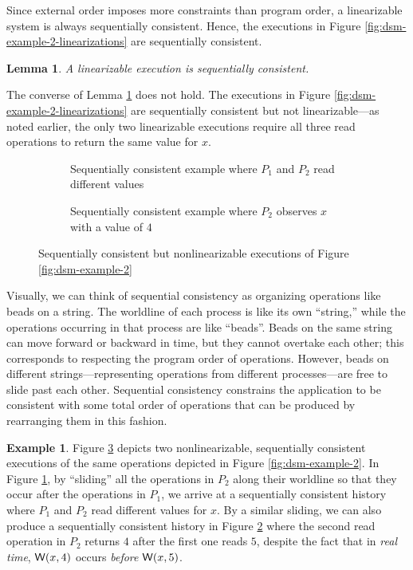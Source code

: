 \documentclass[]             %
{NASA}                       %
\newtheorem{lemma}[theorem]{Lemma}
\theoremstyle{definition}
\newtheorem{example}[theorem]{Example}
\begin{document}
Since external order imposes more constraints than program order, a
linearizable system is always sequentially consistent. Hence, the
executions in Figure \ref{fig:dsm-example-2-linearizations} are
sequentially consistent.
\begin{lemma}
  \label{lem:linearsequential}
  A linearizable execution is sequentially consistent.
\end{lemma}

The converse of Lemma \ref{lem:linearsequential} does not hold. The
executions in Figure \ref{fig:dsm-example-2-linearizations} are
sequentially consistent but not linearizable---as noted earlier, the
only two linearizable executions require all three read operations to
return the same value for $x$.

\begin{figure}
  \begin{subfigure}{1\textwidth}
    \centering
    
    \caption{Sequentially consistent example where $P_1$ and $P_2$ read different values}
    \label{fig:dsm-example-2-sequential-a}
  \end{subfigure}
  \begin{subfigure}{1\textwidth}
    
    \caption{Sequentially consistent example where $P_2$ observes $x$ with a value of $4$}
    \label{fig:dsm-example-2-sequential-b}
  \end{subfigure}
  \caption{Sequentially consistent but nonlinearizable executions of Figure \ref{fig:dsm-example-2}}
  \label{fig:dsm-example-2-sequential}
\end{figure}

Visually, we can think of sequential consistency as organizing
operations like beads on a string. The worldline of each process is
like its own ``string,'' while the operations occurring in that
process are like ``beads''. Beads on the same string can move forward
or backward in time, but they cannot overtake each other; this
corresponds to respecting the program order of operations. However,
beads on different strings---representing operations from different
processes---are free to slide past each other. Sequential consistency
constrains the application to be consistent with some total order of
operations that can be produced by rearranging them in this fashion.

\begin{example}
  Figure \ref{fig:dsm-example-2-sequential} depicts two
  nonlinearizable, sequentially consistent executions of the same
  operations depicted in Figure \ref{fig:dsm-example-2}. In Figure
  \ref{fig:dsm-example-2-sequential-a}, by ``sliding'' all the
  operations in $P_2$ along their worldline so that they occur after
  the operations in $P_1$, we arrive at a sequentially consistent
  history where $P_1$ and $P_2$ read different values for $x$. By a
  similar sliding, we can also produce a sequentially consistent
  history in Figure \ref{fig:dsm-example-2-sequential-b} where the
  second read operation in $P_2$ returns $4$ after the first one reads
  $5$, despite the fact that in \emph{real time}, $\mathsf{W}\!\left(x, 4\right)$
  occurs \emph{before} $\mathsf{W}\!\left(x, 5\right)$.
\end{example}
\end{document}
